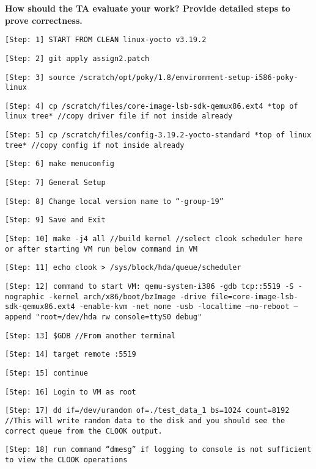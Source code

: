 \documentclass[10pt,letterpaper,draftclsnofoot,onecolumn]{IEEEtran}
\begin{document}
\noindent\textbf{How should the TA evaluate your work? Provide detailed steps to prove correctness.}
\begin{description}
\item \texttt{[Step: 1] START FROM CLEAN linux-yocto v3.19.2}
\item \texttt{[Step: 2] git apply assign2.patch}
\item \texttt{[Step: 3] source /scratch/opt/poky/1.8/environment-setup-i586-poky-linux}
\item \texttt{[Step: 4] cp /scratch/files/core-image-lsb-sdk-qemux86.ext4 *top of linux tree* \newline //copy driver file if not inside already}
\item \texttt{[Step: 5] cp /scratch/files/config-3.19.2-yocto-standard *top of linux tree* \newline//copy config if not inside already}
\item \texttt{[Step: 6] make menuconfig}
\item \texttt{[Step: 7] General Setup}
\item \texttt{[Step: 8] Change local version name to “-group-19”}
\item \texttt{[Step: 9] Save and Exit}
\item \texttt{[Step: 10] make -j4 all \newline //build kernel \newline //select clook scheduler here or after starting VM run below command in VM}
\item \texttt{[Step: 11] echo clook > /sys/block/hda/queue/scheduler}
\item \texttt{[Step: 12] command to start VM: \newline qemu-system-i386 -gdb tcp::5519 -S -nographic -kernel arch/x86/boot/bzImage -drive file=core-image-lsb-sdk-qemux86.ext4 -enable-kvm -net none -usb -localtime --no-reboot --append "root=/dev/hda rw console=ttyS0 debug"}
\item \texttt{[Step: 13] \$GDB \newline //From another terminal}
\item \texttt{[Step: 14] target remote :5519}
\item \texttt{[Step: 15] continue}
\item \texttt{[Step: 16] Login to VM as root}
\item \texttt{[Step: 17] dd if=/dev/urandom of=./test\_data\_1 bs=1024 count=8192 \newline //This will write random data to the disk and you should see the correct queue from the CLOOK output.} 
\item \texttt{[Step: 18] run command “dmesg” if logging to console is not sufficient to view the CLOOK operations}

\end{description}



\end{document}
